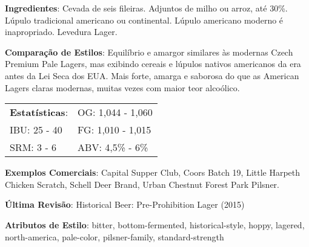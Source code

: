 \textbf{Ingredientes}: Cevada de seis fileiras. Adjuntos de milho ou arroz, até 30\%. Lúpulo tradicional americano ou continental. Lúpulo americano moderno é inapropriado. Levedura Lager.

\textbf{Comparação de Estilos}: Equilíbrio e amargor similares às modernas Czech Premium Pale Lagers, mas exibindo cereais e lúpulos nativos americanos da era antes da Lei Seca dos EUA. Mais forte, amarga e saborosa do que as American Lagers claras modernas, muitas vezes com maior teor alcoólico.

\begin{tabular}{@{}p{35mm}p{35mm}@{}}
  \textbf{Estatísticas}: & OG: 1,044 - 1,060  \\
  IBU: 25 - 40  & FG: 1,010 - 1,015  \\
  SRM: 3 - 6 & ABV: 4,5\% - 6\%
\end{tabular}

\textbf{Exemplos Comerciais}: Capital Supper Club, Coors Batch 19, Little Harpeth Chicken Scratch, Schell Deer Brand, Urban Chestnut Forest Park Pilsner.

\textbf{Última Revisão}: Historical Beer: Pre-Prohibition Lager (2015)

\textbf{Atributos de Estilo}: bitter, bottom-fermented, historical-style, hoppy, lagered, north-america, pale-color, pilsner-family, standard-strength
